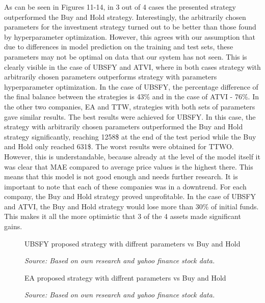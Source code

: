 \documentclass[11pt]{article} %
\begin{document}
	 As can be seen in Figures 11-14, in 3 out of 4 cases the presented strategy outperformed the Buy and Hold strategy. Interestingly, the arbitrarily chosen parameters for the investment strategy turned out to be better than those found by hyperparameter optimization. However, this agrees with our assumption that due to differences in model prediction on the training and test sets, these parameters may not be optimal on data that our system has not seen. This is clearly visible in the case of UBSFY and ATVI, where in both cases strategy with arbitrarily chosen parameters outperforms strategy with parameters hyperparameter optimization. In the case of UBSFY, the percentage difference of the final balance between the strategies is 43\% and in the case of ATVI - 76\%. In the other two companies, EA and TTW, strategies with both sets of parameters gave similar results. The best results were achieved for UBSFY. In this case, the strategy with arbitrarily chosen parameters outperformed the Buy and Hold strategy significantly, reaching 1258\$ at the end of the test period while the Buy and Hold only reached 631\$. The worst results were obtained for TTWO. However, this is understandable, because already at the level of the model itself it was clear that MAE compared to average price values is the highest there. This means that this model is not good enough and needs further research. It is important to note that each of these companies was in a downtrend. For each company, the Buy and Hold strategy proved unprofitable. In the case of UBSFY and ATVI, the Buy and Hold strategy would lose more than 30\% of initial funds. This makes it all the more optimistic that 3 of the 4 assets made significant gains. 

\begin{figure}[H]
\caption{UBSFY proposed strategy with diffrent parameters vs Buy and Hold}
\begin{adjustbox}{width=1.3\textwidth,center}

\end{adjustbox}
\caption*{\textit{Source: Based on own research and yahoo finance stock data.}}
\end{figure}

\begin{figure}[H]
\caption{EA proposed strategy with diffrent parameters vs Buy and Hold}
\begin{adjustbox}{width=1.3\textwidth,center}

\end{adjustbox}
\caption*{\textit{Source: Based on own research and yahoo finance stock data.}}
\end{figure}
\end{document}
